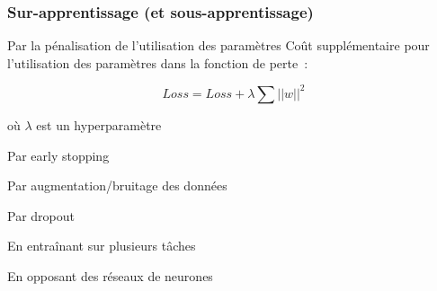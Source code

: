 \begin{frame}
  \frametitle{Sur-apprentissage (et sous-apprentissage)}
\end{frame}

\begin{frame}{Par la pénalisation de l'utilisation des paramètres}
  Coût supplémentaire pour l'utilisation des paramètres dans la fonction de perte~:

  \[
  Loss = Loss + \lambda\sum||w||^2
  \]

  où $\lambda$ est un hyperparamètre
\end{frame}

\begin{frame}{Par early stopping}
\end{frame}

\begin{frame}{Par augmentation/bruitage des données}
\end{frame}

\begin{frame}{Par dropout}
\end{frame}

\begin{frame}{En entraînant sur plusieurs tâches}
\end{frame}

\begin{frame}{En opposant des réseaux de neurones}
\end{frame}

